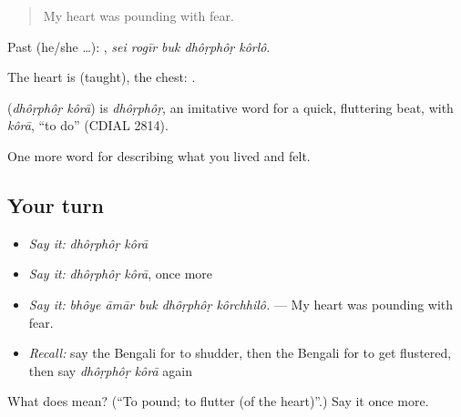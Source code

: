 \begin{quote}
My heart was pounding with fear.
\end{quote}

Past (he/she …):     , \emph{sei rogīr buk dhôṛphôṛ kôrlô}.

The heart is  (taught), the chest:   .

\begin{cousinweb}
\textbf{ } (\emph{dhôṛphôṛ kôrā}) is \emph{dhôṛphôṛ}, an imitative word for a quick, fluttering beat, with \emph{kôrā}, \textquotedblleft{}to do\textquotedblright{} (CDIAL 2814).
\end{cousinweb}

\begin{grammarlens}[title={What you've built}]
One more word for describing what you lived and felt.
\end{grammarlens}

\subsection*{Your turn}
\begin{itemize}
\raggedright
  \item \emph{Say it:} \emph{dhôṛphôṛ kôrā}
  \item \emph{Say it:} \emph{dhôṛphôṛ kôrā}, once more
  \item \emph{Say it:} \emph{bhôye āmār buk dhôṛphôṛ kôrchhilô.} — My heart was pounding with fear.
  \item \emph{Recall:} say the Bengali for to shudder, then the Bengali for to get flustered, then say \emph{dhôṛphôṛ kôrā} again
\end{itemize}

\begin{tcolorbox}[breakable,colback=teal!4,colframe=teal!35!black,title={Before you move on}]
What does   mean? (\textquotedblleft{}To pound; to flutter (of the heart)\textquotedblright{}.) Say it once more.
\end{tcolorbox}
